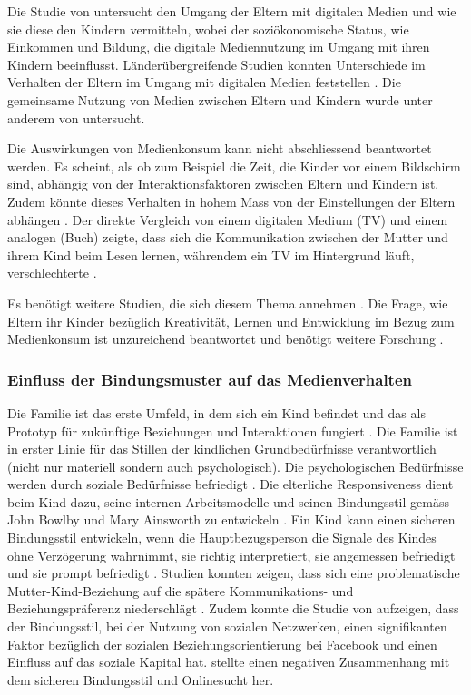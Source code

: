 Die Studie von  untersucht den Umgang der Eltern mit digitalen Medien und wie sie diese den Kindern vermitteln, wobei der soziökonomische Status, wie Einkommen und Bildung, die digitale Mediennutzung im Umgang mit ihren Kindern beeinflusst. Länderübergreifende Studien konnten Unterschiede im Verhalten der Eltern im Umgang mit digitalen Medien feststellen \cite{Helsper2013}. Die gemeinsame Nutzung von Medien zwischen Eltern und Kindern wurde unter anderem von  untersucht. 

Die Auswirkungen von Medienkonsum kann nicht abschliessend beantwortet werden. Es scheint, als ob zum Beispiel die Zeit, die Kinder vor einem Bildschirm sind, abhängig von der Interaktionsfaktoren zwischen Eltern und Kindern ist. Zudem könnte dieses Verhalten in hohem Mass von der Einstellungen der Eltern abhängen \cite{Lauricella2015}. Der direkte Vergleich von einem digitalen Medium (TV) und einem analogen (Buch) zeigte, dass sich die Kommunikation zwischen der Mutter und ihrem Kind beim Lesen lernen, währendem ein TV im Hintergrund läuft, verschlechterte \cite{Nathanson2011}.

Es benötigt weitere Studien, die sich diesem Thema annehmen \cite{Wartella2016}. Die Frage, wie Eltern ihr Kinder bezüglich Kreativität, Lernen und Entwicklung im Bezug zum Medienkonsum ist unzureichend beantwortet und benötigt weitere Forschung \cite{AmericanAcademyofPediatrics2011,Troseth2016}. 

\subsubsection{Einfluss der Bindungsmuster auf das Medienverhalten} 
Die Familie ist das erste Umfeld, in dem sich ein Kind befindet  und das als Prototyp für zukünftige Beziehungen und Interaktionen fungiert \cite{Floros2013}. Die Familie ist in erster Linie für das Stillen der kindlichen Grundbedürfnisse verantwortlich (nicht nur materiell sondern auch psychologisch). Die psychologischen Bedürfnisse werden durch soziale Bedürfnisse befriedigt \cite{Hazan1994}. Die elterliche Responsiveness dient beim Kind dazu, seine internen Arbeitsmodelle und seinen Bindungsstil gemäss John Bowlby und Mary Ainsworth zu entwickeln \cite{Bretherton1999}. Ein Kind kann einen sicheren Bindungsstil entwickeln, wenn die Hauptbezugsperson die Signale des Kindes ohne Verzögerung wahrnimmt, sie richtig interpretiert, sie angemessen befriedigt und sie prompt befriedigt \cite{Bell1972}. Studien konnten zeigen, dass sich eine problematische Mutter-Kind-Beziehung auf die spätere Kommunikations- und Beziehungspräferenz niederschlägt \cite{Szwedo2011}. Zudem konnte die Studie von  aufzeigen, dass der Bindungsstil, bei der Nutzung von sozialen Netzwerken, einen signifikanten Faktor bezüglich der sozialen Beziehungsorientierung bei Facebook und einen Einfluss auf das soziale Kapital hat.  stellte einen negativen Zusammenhang mit dem sicheren Bindungsstil und Onlinesucht her.  


